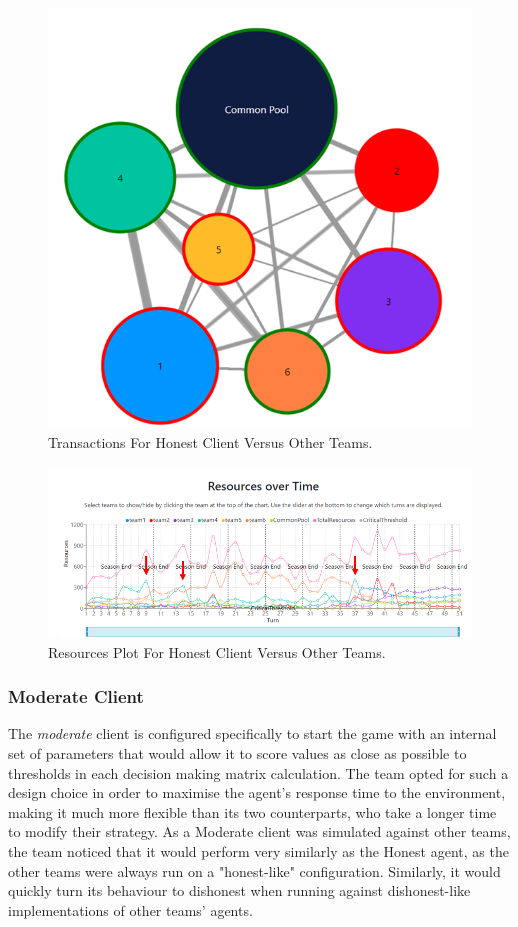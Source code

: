 \begin{figure}[H]
\centering
\includegraphics[scale=0.4]{12_team4_agentdesign/images/TransactionsHO.png}
\caption{Transactions For Honest Client Versus Other Teams.}
\label{fig:TransactionsHO}
\end{figure}
\begin{figure}[H]
\centering
\includegraphics[scale=0.7]{12_team4_agentdesign/images/ResourcesHO.PNG}
\caption{Resources Plot For Honest Client Versus Other Teams.}
\label{fig:ResourcesHO}
\end{figure}

\subsubsection{Moderate Client} \label{moderateAO}
The \emph{moderate} client is configured specifically to start the game with an internal set of parameters that would allow it to score values as close as possible to thresholds in each decision making matrix calculation. The team opted for such a design choice in order to maximise the agent's response time to the environment, making it much more flexible than its two counterparts, who take a longer time to modify their strategy. As a Moderate client was simulated against other teams, the team noticed that it would perform very similarly as the Honest agent, as the other teams were always run on a "honest-like" configuration. Similarly, it would quickly turn its behaviour to dishonest when running against dishonest-like implementations of other teams' agents.

